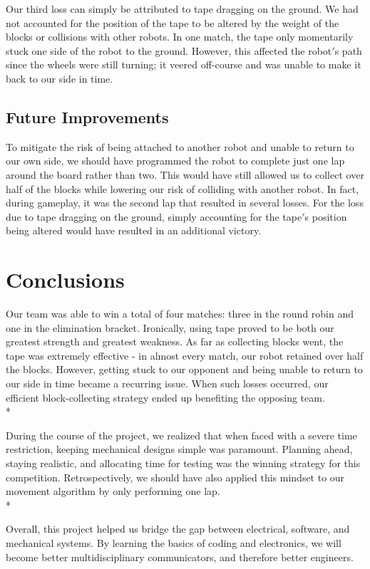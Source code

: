 \documentclass[11.5pt]{article}
\begin{document}
\noindent
Our third loss can simply be attributed to tape dragging on the ground. We had not accounted for the position of the tape to be altered by the weight of the blocks or collisions with other robots. In one match, the tape only momentarily stuck one side of the robot to the ground. However, this affected the robot$'$s path since the wheels were still turning; it veered off-course and was unable to make it back to our side in time. 

\subsection{Future Improvements}
\noindent
To mitigate the risk of being attached to another robot and unable to return to our own side, we should have programmed the robot to complete just one lap around the board rather than two. This would have still allowed us to collect over half of the blocks while lowering our risk of colliding with another robot. In fact, during gameplay, it was the second lap that resulted in several losses. For the loss due to tape dragging on the ground, simply accounting for the tape$'$s position being altered would have resulted in an additional victory. 

\section{Conclusions}

Our team was able to win a total of four matches: three in the round robin and one in the elimination bracket. Ironically, using tape proved to be both our greatest strength and greatest weakness. As far as collecting blocks went, the tape was extremely effective - in almost every match, our robot retained over half the blocks. However, getting stuck to our opponent and being unable to return to our side in time became a recurring issue. When such losses occurred, our efficient block-collecting strategy ended up benefiting the opposing team. 
\\*

\noindent
During the course of the project, we realized that when faced with a severe time restriction, keeping mechanical designs simple was paramount. Planning ahead, staying realistic, and allocating time for testing was the winning strategy for this competition. Retrospectively, we should have also applied this mindset to our movement algorithm by only performing one lap. 
\\*

\noindent
Overall, this project helped us bridge the gap between electrical, software, and mechanical systems. By learning the basics of coding and electronics, we will become better multidisciplinary communicators, and therefore better engineers. 
\end{document}
